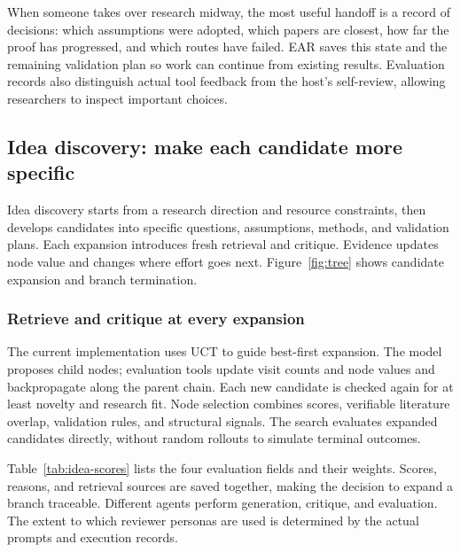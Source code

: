 When someone takes over research midway, the most useful handoff is a record of decisions: which assumptions were adopted, which papers are closest, how far the proof has progressed, and which routes have failed. EAR saves this state and the remaining validation plan so work can continue from existing results. Evaluation records also distinguish actual tool feedback from the host's self-review, allowing researchers to inspect important choices.

\FloatBarrier
\subsection{Idea discovery: make each candidate more specific}
\label{sec:idea}
Idea discovery starts from a research direction and resource constraints, then develops candidates into specific questions, assumptions, methods, and validation plans. Each expansion introduces fresh retrieval and critique. Evidence updates node value and changes where effort goes next. Figure~\ref{fig:tree} shows candidate expansion and branch termination.


\subsubsection{Retrieve and critique at every expansion}
The current implementation uses UCT to guide best-first expansion. The model proposes child nodes; evaluation tools update visit counts and node values and backpropagate along the parent chain. Each new candidate is checked again for at least novelty and research fit. Node selection combines scores, verifiable literature overlap, validation rules, and structural signals. The search evaluates expanded candidates directly, without random rollouts to simulate terminal outcomes.

Table~\ref{tab:idea-scores} lists the four evaluation fields and their weights. Scores, reasons, and retrieval sources are saved together, making the decision to expand a branch traceable. Different agents perform generation, critique, and evaluation. The extent to which reviewer personas are used is determined by the actual prompts and execution records.

